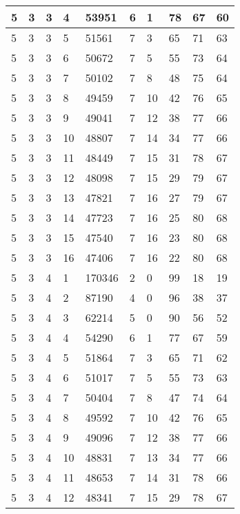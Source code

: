 \begin{table}[!ht]
\begin{tabular}{|l|l|l|l|l|l|l|l|l|l|}
        5 & 3 & 3 & 4 & 53951 & 6 & 1 & 78 & 67 & 60 \\ \hline
        5 & 3 & 3 & 5 & 51561 & 7 & 3 & 65 & 71 & 63 \\ \hline
        5 & 3 & 3 & 6 & 50672 & 7 & 5 & 55 & 73 & 64 \\ \hline
        5 & 3 & 3 & 7 & 50102 & 7 & 8 & 48 & 75 & 64 \\ \hline
        5 & 3 & 3 & 8 & 49459 & 7 & 10 & 42 & 76 & 65 \\ \hline
        5 & 3 & 3 & 9 & 49041 & 7 & 12 & 38 & 77 & 66 \\ \hline
        5 & 3 & 3 & 10 & 48807 & 7 & 14 & 34 & 77 & 66 \\ \hline
        5 & 3 & 3 & 11 & 48449 & 7 & 15 & 31 & 78 & 67 \\ \hline
        5 & 3 & 3 & 12 & 48098 & 7 & 15 & 29 & 79 & 67 \\ \hline
        5 & 3 & 3 & 13 & 47821 & 7 & 16 & 27 & 79 & 67 \\ \hline
        5 & 3 & 3 & 14 & 47723 & 7 & 16 & 25 & 80 & 68 \\ \hline
        5 & 3 & 3 & 15 & 47540 & 7 & 16 & 23 & 80 & 68 \\ \hline
        5 & 3 & 3 & 16 & 47406 & 7 & 16 & 22 & 80 & 68 \\ \hline
        5 & 3 & 4 & 1 & 170346 & 2 & 0 & 99 & 18 & 19 \\ \hline
        5 & 3 & 4 & 2 & 87190 & 4 & 0 & 96 & 38 & 37 \\ \hline
        5 & 3 & 4 & 3 & 62214 & 5 & 0 & 90 & 56 & 52 \\ \hline
        5 & 3 & 4 & 4 & 54290 & 6 & 1 & 77 & 67 & 59 \\ \hline
        5 & 3 & 4 & 5 & 51864 & 7 & 3 & 65 & 71 & 62 \\ \hline
        5 & 3 & 4 & 6 & 51017 & 7 & 5 & 55 & 73 & 63 \\ \hline
        5 & 3 & 4 & 7 & 50404 & 7 & 8 & 47 & 74 & 64 \\ \hline
        5 & 3 & 4 & 8 & 49592 & 7 & 10 & 42 & 76 & 65 \\ \hline
        5 & 3 & 4 & 9 & 49096 & 7 & 12 & 38 & 77 & 66 \\ \hline
        5 & 3 & 4 & 10 & 48831 & 7 & 13 & 34 & 77 & 66 \\ \hline
        5 & 3 & 4 & 11 & 48653 & 7 & 14 & 31 & 78 & 66 \\ \hline
        5 & 3 & 4 & 12 & 48341 & 7 & 15 & 29 & 78 & 67 \\ \hline

\end{tabular}
\end{table}
